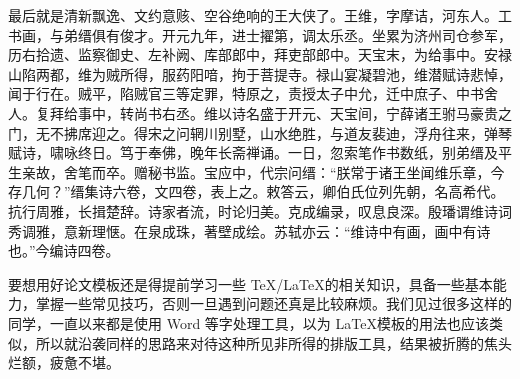 \documentclass[../Main/thesis.tex]{subfiles}
\begin{document}
最后就是清新飘逸、文约意赅、空谷绝响的王大侠了。王维，字摩诘，河东人。工书画，与弟缙俱有俊才。开元九年，进士擢第，调太乐丞。坐累为济州司仓参军，历右拾遗、监察御史、左补阙、库部郎中，拜吏部郎中。天宝末，为给事中。安禄山陷两都，维为贼所得，服药阳喑，拘于菩提寺。禄山宴凝碧池，维潜赋诗悲悼，闻于行在。贼平，陷贼官三等定罪，特原之，责授太子中允，迁中庶子、中书舍人。复拜给事中，转尚书右丞。维以诗名盛于开元、天宝间，宁薛诸王驸马豪贵之门，无不拂席迎之。得宋之问辋川别墅，山水绝胜，与道友裴迪，浮舟往来，弹琴赋诗，啸咏终日。笃于奉佛，晚年长斋禅诵。一日，忽索笔作书数纸，别弟缙及平生亲故，舍笔而卒。赠秘书监。宝应中，代宗问缙：“朕常于诸王坐闻维乐章，今存几何？”缙集诗六卷，文四卷，表上之。敕答云，卿伯氏位列先朝，名高希代。抗行周雅，长揖楚辞。诗家者流，时论归美。克成编录，叹息良深。殷璠谓维诗词秀调雅，意新理惬。在泉成珠，著壁成绘。苏轼亦云：“维诗中有画，画中有诗也。”今编诗四卷。

要想用好论文模板还是得提前学习一些 \TeX/\LaTeX{}的相关知识，具备一些基本能力，掌握一些常见技巧，否则一旦遇到问题还真是比较麻烦。我们见过很多这样的同学，一直以来都是使用 Word 等字处理工具，以为 \LaTeX{}模板的用法也应该类似，所以就沿袭同样的思路来对待这种所见非所得的排版工具，结果被折腾的焦头烂额，疲惫不堪。
\end{document}
